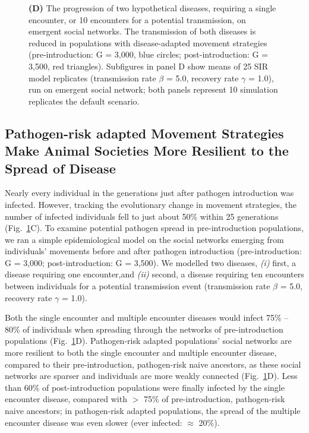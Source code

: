 \begin{figure}[!h]
{        \textbf{(D)} The progression of two hypothetical diseases, requiring a single encounter, or 10 encounters for a potential transmission, on emergent social networks. 
        The transmission of both diseases is reduced in populations with disease-adapted movement strategies (pre-introduction: G = 3,000, blue circles; post-introduction: G = 3,500, red triangles). Subfigures in panel D show means of 25 SIR model replicates (transmission rate $\beta$ = 5.0, recovery rate $\gamma$ = 1.0), run on emergent social network; both panels represent 10 simulation replicates the default scenario.
    }\label{fig_networks_disease}
\end{figure}

\subsection*{Pathogen-risk adapted Movement Strategies Make Animal Societies More Resilient to the Spread of Disease}

Nearly every individual in the generations just after pathogen introduction was infected.
However, tracking the evolutionary change in movement strategies, the number of infected individuals fell to just about 50\% within 25 generations (Fig.~\ref{fig_networks_disease}C).
To examine potential pathogen spread in pre-introduction populations, we ran a simple epidemiological model on the social networks emerging from individuals' movements before and after pathogen introduction (pre-introduction: G = 3,000; post-introduction: G = 3,500).
We modelled two diseases, \textit{(i)} first, a disease requiring one encounter,and \textit{(ii)} second, a disease requiring ten encounters between individuals for a potential transmission event (transmission rate $\beta$ = 5.0, recovery rate $\gamma$ = 1.0).

Both the single encounter and multiple encounter diseases would infect 75\% -- 80\% of individuals when spreading through the networks of pre-introduction populations (Fig.~\ref{fig_networks_disease}D).
Pathogen-risk adapted populations' social networks are more resilient to both the single encounter and multiple encounter disease, compared to their pre-introduction, pathogen-risk naive ancestors, as these social networks are sparser and individuals are more weakly connected (Fig.~\ref{fig_networks_disease}D).
Less than 60\% of post-introduction populations were finally infected by the single encounter disease, compared with $>$ 75\% of pre-introduction, pathogen-risk naive ancestors; in pathogen-risk adapted populations, the spread of the multiple encounter disease was even slower (ever infected: $\approx$ 20\%).

